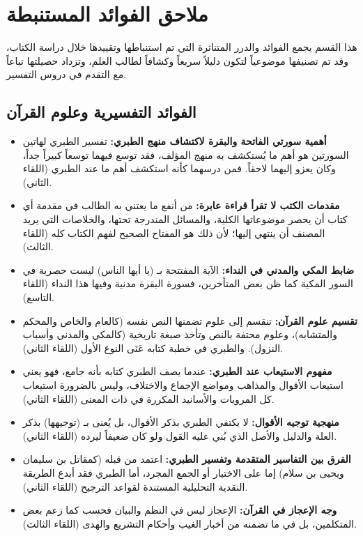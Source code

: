 \appendix
\chapter{ملاحق الفوائد المستنبطة}

هذا القسم يجمع الفوائد والدرر المتناثرة التي تم استنباطها وتقييدها خلال دراسة الكتاب، وقد تم تصنيفها موضوعياً لتكون دليلاً سريعاً وكشافاً لطالب العلم، وتزداد حصيلتها تباعاً مع التقدم في دروس التفسير.

\section{الفوائد التفسيرية وعلوم القرآن}
\begin{itemize}
    \item \textbf{أهمية سورتي الفاتحة والبقرة لاكتشاف منهج الطبري:} تفسير الطبري لهاتين السورتين هو أهم ما يُستكشف به منهج المؤلف، فقد توسع فيهما توسعاً كبيراً جداً، وكان يعزو إليهما لاحقاً. فمن درسهما كأنه استكشف أهم ما عند الطبري (اللقاء الثاني).
    \item \textbf{مقدمات الكتب لا تقرأ قراءة عابرة:} من أنفع ما يعتني به الطالب في مقدمة أي كتاب أن يحصر موضوعاتها الكلية، والمسائل المندرجة تحتها، والخلاصات التي يريد المصنف أن ينتهي إليها؛ لأن ذلك هو المفتاح الصحيح لفهم الكتاب كله (اللقاء الثالث).
    \item \textbf{ضابط المكي والمدني في النداء:} الآية المفتتحة بـ (يا أيها الناس) ليست حصرية في السور المكية كما ظن بعض المتأخرين، فسورة البقرة مدنية وفيها هذا النداء (اللقاء التاسع).
    \item \textbf{تقسيم علوم القرآن:} تنقسم إلى علوم تضمنها النص نفسه (كالعام والخاص والمحكم والمتشابه)، وعلوم محتفة بالنص وتأخذ صبغة تاريخية (كالمكي والمدني وأسباب النزول). والطبري في خطبة كتابه عَنَى النوع الأول (اللقاء الثاني).
    \item \textbf{مفهوم الاستيعاب عند الطبري:} عندما يصف الطبري كتابه بأنه جامع، فهو يعني استيعاب الأقوال والمذاهب ومواضع الإجماع والاختلاف، وليس بالضرورة استيعاب كل المرويات والأسانيد المكررة في ذات المعنى (اللقاء الثاني).
    \item \textbf{منهجية توجيه الأقوال:} لا يكتفي الطبري بذكر الأقوال، بل يُعنى بـ (توجيهها) بذكر العلة والدليل والأصل الذي بُني عليه القول ولو كان ضعيفاً ليرده (اللقاء الثاني).
    \item \textbf{الفرق بين التفاسير المتقدمة وتفسير الطبري:} اعتمد من قبله (كمقاتل بن سليمان ويحيى بن سلام) إما على الاختيار أو الجمع المجرد، أما الطبري فقد أبدع الطريقة النقدية التحليلية المستندة لقواعد الترجيح (اللقاء الثاني).
    \item \textbf{وجه الإعجاز في القرآن:} الإعجاز ليس في النظم والبيان فحسب كما زعم بعض المتكلمين، بل في ما تضمنه من أخبار الغيب وأحكام التشريع والهدى (اللقاء الثالث).

\end{itemize}
